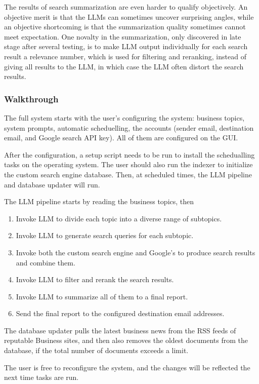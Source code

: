 \documentclass[final-report]{report-template}
\begin{document}
The results of search summarization are even harder to qualify objectively. An
objective merit is that the LLMs can sometimes uncover surprising angles, while
an objective shortcoming is that the summarization quality sometimes cannot
meet expectation. One novalty in the summarization, only discovered in late
stage after several testing, is to make LLM output individually for each search
result a relevance number, which is used for filtering and reranking, instead
of giving all results to the LLM, in which case the LLM often distort the
search results.

\subsubsection{Walkthrough}
The full system starts with the user's configuring the system: business topics,
system prompts, automatic scheduelling, the accounts (sender email, destination
email, and Google search API key). All of them are configured on the GUI.

After the configuration, a setup script needs to be run to install the
schedualling tasks on the operating system. The user should also run the
indexer to initialize the custom search engine database. Then, at scheduled
times, the LLM pipeline and database updater will run.

The LLM pipeline starts by reading the business topics, then
\begin{enumerate}
	\item Invoke LLM to divide each topic into a diverse range of subtopics.
	\item Invoke LLM to generate search queries for each subtopic.
	\item Invoke both the custom search engine and Google's to produce search
		results and combine them.
	\item Invoke LLM to filter and rerank the search results.
	\item Invoke LLM to summarize all of them to a final report.
	\item Send the final report to the configured destination email addresses.
\end{enumerate}

The database updater pulls the latest business news from the RSS feeds of
reputable Business sites, and then also removes the oldest documents from the
database, if the total number of documents exceeds a limit.

The user is free to reconfigure the system, and the changes will be reflected
the next time tasks are run.
\end{document}
